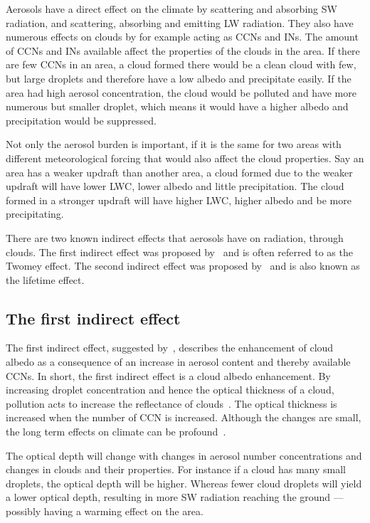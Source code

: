 Aerosols have a direct effect on the climate by scattering and absorbing SW radiation, and scattering, absorbing and emitting LW radiation.%
They also have numerous effects on clouds by for example acting as CCNs and INs. The amount of CCNs and INs available affect the properties of the clouds in the area.
If there are few CCNs in an area, a cloud formed there would be a clean cloud with few, but large droplets and therefore have a low albedo and precipitate easily. If the area had high aerosol concentration, the cloud would be polluted and have more numerous but smaller droplet, which means it would have a higher albedo and precipitation would be suppressed. 

Not only the aerosol burden is important, if it is the same for two areas with different meteorological forcing that would also affect the cloud properties. Say an area has a weaker updraft than another area, a cloud formed due to the weaker updraft will have lower LWC, lower albedo and little precipitation. The cloud formed in a stronger updraft will have higher LWC, higher albedo and be more precipitating.

There are two known indirect effects that aerosols have on radiation, through clouds. The first indirect effect was proposed by~\citet{Twomey1974} and is often referred to as the Twomey effect. The second indirect effect was proposed by~\citet{Albrecht1989} and is also known as the lifetime effect.

\subsection{The first indirect effect}%
The first indirect effect, suggested by~\citet{Twomey1974}, describes the enhancement of cloud albedo as a consequence of an increase in aerosol content and thereby available CCNs.
In short, the first indirect effect is a cloud albedo enhancement.
By increasing droplet concentration and hence the optical thickness of a cloud, pollution acts to increase the reflectance of clouds~\citep{Twomey1977}. 
The optical thickness is increased when the number of CCN is increased. Although the changes are small, the long term effects on climate can be profound~\citep{Twomey1974}.

The optical depth will change with changes in aerosol number concentrations and changes in clouds and their properties. For instance if a cloud has many small droplets, the optical depth will be higher. Whereas  fewer cloud droplets will yield a lower optical depth, resulting in more SW radiation reaching the ground — possibly having a warming effect on the area. 

